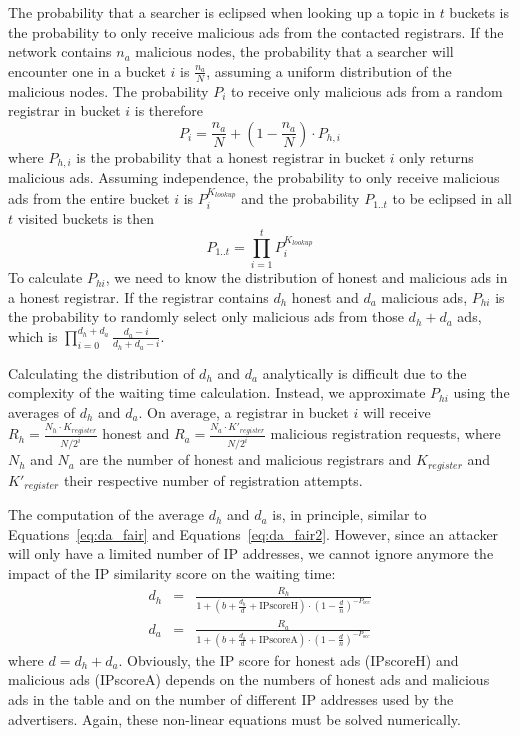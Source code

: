 The probability that a searcher is eclipsed when looking up a topic in $t$ buckets is the probability to only receive malicious ads from the contacted registrars. If the network contains $n_a$ malicious nodes, the probability that a searcher will encounter one in a bucket $i$ is $\frac{n_a}{N}$, assuming a uniform distribution of the malicious nodes.
The probability $P_i$ to receive only malicious ads from a random registrar in bucket $i$ is therefore
$$ P_{i} = \frac{n_a}{N} + (1-\frac{n_a}{N}) \cdot P_{h,i}$$
where $P_{h,i}$ is the probability that a honest registrar in bucket $i$ only returns malicious ads.
Assuming independence, the probability to only receive malicious ads from the entire bucket $i$ is $P_{i}^{K_{lookup}}$ and the probability $P_{1..t}$ to be eclipsed in all $t$ visited buckets is then
$$ P_{1..t} = \prod_{i=1}^{t} P_{i}^{K_{lookup}}$$
To calculate $P_{hi}$, we need to know the distribution of honest and malicious ads in a honest registrar.
If the registrar contains $d_h$ honest and $d_a$ malicious ads, $P_{hi}$ is the probability to randomly select only malicious ads from those $d_h+d_a$ ads, which is $\prod_{i=0}^{d_h+d_a} \frac{d_a - i}{d_h+d_a-i}$.

Calculating the distribution of $d_h$ and $d_a$ analytically is difficult due to the complexity of the waiting time calculation. Instead, we approximate $P_{hi}$ using the averages of $d_h$ and $d_a$.
On average, a registrar in bucket $i$ will receive $R_h = \frac{N_h\cdot K_{register}}{N/2^i}$ honest and $R_a = \frac{N_a\cdot K'_{register}}{N/2^i}$ malicious registration requests, where $N_h$ and $N_a$ are the number of honest and malicious registrars and $K_{register}$ and $K'_{register}$ their respective number of registration attempts.

The computation of the average $d_h$ and $d_a$ is, in principle, similar to Equations~\ref{eq:da_fair} and Equations~\ref{eq:da_fair2}. However, since an attacker will only have a limited number of IP addresses, we cannot ignore anymore the impact of the IP similarity score on the waiting time:
\begin{eqnarray}
d_h & = & \frac{R_h}{1 + (b + \frac{d_h}{d} + \mbox{IPscoreH}) \cdot (1 - \frac{d}{n})^{-P_{occ}}}\\
d_a & = & \frac{R_a}{1 + (b + \frac{d_a}{d} + \mbox{IPscoreA}) \cdot (1 - \frac{d}{n})^{-P_{occ}}}
\end{eqnarray}
where $d = d_h + d_a$. Obviously, the IP score for honest ads (IPscoreH) and malicious ads (IPscoreA) depends on the numbers of honest ads and malicious ads in the table and on the number of different IP addresses used by the advertisers. Again, these non-linear equations must be solved numerically.

